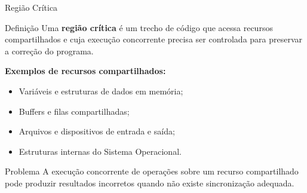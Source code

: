 \documentclass[aspectratio=169,11pt]{beamer}
\begin{document}
\begin{frame}{Região Crítica}

\begin{block}{Definição}
Uma \textbf{região crítica} é um trecho de código que acessa
recursos compartilhados e cuja execução concorrente precisa
ser controlada para preservar a correção do programa.
\end{block}

\vspace{0.4cm}

\textbf{Exemplos de recursos compartilhados:}

\begin{itemize}
    \item Variáveis e estruturas de dados em memória;
    \item Buffers e filas compartilhadas;
    \item Arquivos e dispositivos de entrada e saída;
    \item Estruturas internas do Sistema Operacional.
\end{itemize}

\vspace{0.3cm}

\begin{alertblock}{Problema}
A execução concorrente de operações sobre um recurso
compartilhado pode produzir resultados incorretos
quando não existe sincronização adequada.
\end{alertblock}

\end{frame}


\end{document}
